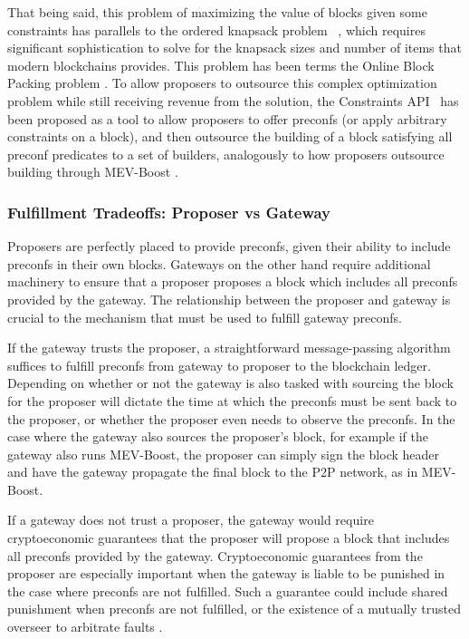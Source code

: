 \documentclass[a4paper]{article}
\theoremstyle{boldstyle}
\begin{document}
That being said, this problem of maximizing the value of blocks given some constraints has parallels to the ordered knapsack problem ~\cite{P:Partiallyorderedknapsackandapplicationstoscheculing}, which requires significant sophistication to solve for the knapsack sizes and number of items that modern blockchains provides. This problem has been terms the Online Block Packing problem \cite{OnlineBlockPacking}. To allow proposers to outsource this complex optimization problem while still receiving revenue from the solution, the Constraints API~\cite{W:ConstraintsAPISpecification} has been proposed as a tool to allow proposers to offer preconfs (or apply arbitrary constraints on a block), and then outsource the building of a block satisfying all preconf predicates to a set of builders, analogously to how proposers outsource building through MEV-Boost \cite{MEV-Boost}. 

\subsubsection{Fulfillment Tradeoffs: Proposer vs Gateway}
\label{delivery_tradeoffs}

Proposers are perfectly placed to provide preconfs, given their ability to include preconfs in their own blocks. Gateways on the other hand require additional machinery to ensure that a proposer proposes a block which includes all preconfs provided by the gateway. The relationship between the proposer and gateway is crucial to the mechanism that must be used to fulfill gateway preconfs. 

If the gateway trusts the proposer, a straightforward message-passing algorithm suffices to fulfill preconfs from gateway to proposer to the blockchain ledger. Depending on whether or not the gateway is also tasked with sourcing the block for the proposer will dictate the time at which the preconfs must be sent back to the proposer, or whether the proposer even needs to observe the preconfs. In the case where the gateway also sources the proposer's block, for example if the gateway also runs MEV-Boost, the proposer can simply sign the block header and have the gateway propagate the final block to the P2P network, as in MEV-Boost.

If a gateway does not trust a proposer, the gateway would require cryptoeconomic guarantees that the proposer will propose a block that includes all preconfs provided by the gateway. Cryptoeconomic guarantees from the proposer are especially important when the gateway is liable to be punished in the case where preconfs are not fulfilled. Such a guarantee could include shared punishment when preconfs are not fulfilled, or the existence of a mutually trusted overseer to arbitrate faults \cite{W:PreconfirmationFairExchange,W:FaultAttribution}. 
\end{document}
